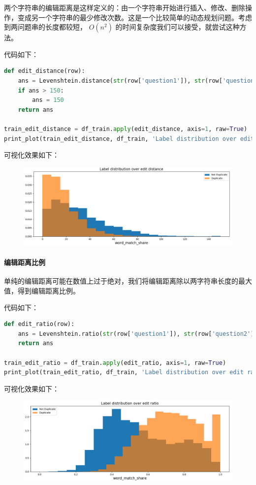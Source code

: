 \documentclass{article}
\begin{document}
两个字符串的编辑距离是这样定义的：由一个字符串开始进行插入、修改、删除操作，变成另一个字符串的最少修改次数。这是一个比较简单的动态规划问题。考虑到两问题串的长度都较短， $O(n^2)$ 的时间复杂度我们可以接受，就尝试这种方法。

代码如下：

\begin{lstlisting}[language=python]
def edit_distance(row):
    ans = Levenshtein.distance(str(row['question1']), str(row['question2']))
    if ans > 150:
        ans = 150
    return ans

train_edit_distance = df_train.apply(edit_distance, axis=1, raw=True)
print_plot(train_edit_distance, df_train, 'Label distribution over edit distance', '5.png')
\end{lstlisting}

可视化效果如下：

\begin{figure}[!h]
\centering
\includegraphics[scale=0.5]{5.png}
\end{figure}

\paragraph{编辑距离比例}

单纯的编辑距离可能在数值上过于绝对，我们将编辑距离除以两字符串长度的最大值，得到编辑距离比例。

代码如下：

\begin{lstlisting}[language=python]
def edit_ratio(row):
    ans = Levenshtein.ratio(str(row['question1']), str(row['question2']))
    return ans

train_edit_ratio = df_train.apply(edit_ratio, axis=1, raw=True)
print_plot(train_edit_ratio, df_train, 'Label distribution over edit ratio', '6.png')
\end{lstlisting}

可视化效果如下：

\begin{figure}[!h]
\centering
\includegraphics[scale=0.5]{6.png}
\end{figure}
\end{document}
